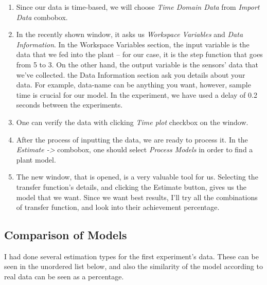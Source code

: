 \documentclass[11pt,a4paper,twocolumn]{article}
\begin{document}
\begin{enumerate}
    \item Since our data is time-based, we will choose \textit{Time Domain Data} from \textit{Import Data} combobox.
    \item In the recently shown window, it asks us \textit{Workspace Variables} and \textit{Data Information}. In the Workspace Variables section, the input variable is the data that we fed into the plant -- for our case, it is the step function that goes from 5 to 3. On the other hand, the output variable is the sensors' data that we've collected. the Data Information section ask you details about your data. For example, data-name can be anything you want, however, sample time is crucial for our model. In the experiment, we have used a delay of 0.2 seconds between the experiments.
    \item One can verify the data with clicking \textit{Time plot} checkbox on the window.
    \item After the process of inputting the data, we are ready to process it. In the \textit{Estimate ->} combobox, one should select \textit{Process Models} in order to find a plant model.
    \item The new window, that is opened, is a very valuable tool for us. Selecting the transfer function's details, and clicking the Estimate button, gives us the model that we want. Since we want best results, I'll try all the combinations of transfer function, and look into their achievement percentage.
\end{enumerate}

\subsection{Comparison of Models}
I had done several estimation types for the first experiment's data. These can be seen in the unordered list below, and also the similarity of the model according to real data can be seen as a percentage.
\end{document}
